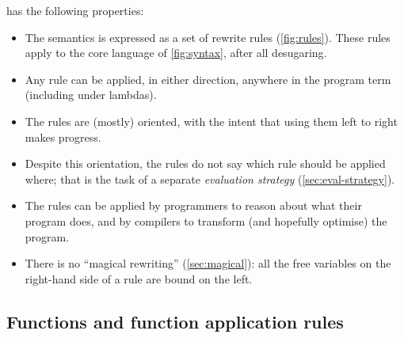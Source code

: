 \documentclass[acmsmall]{acmart}
\newcommand{\ie}{\emph{i.e.}\xspace}	%
\newcommand{\Eg}{\emph{E.g.}\xspace}
\begin{document}
has the following properties:
\begin{itemize}
\item The semantics is expressed as a set of rewrite rules (\cref{fig:rules}). These rules apply to the core language of \cref{fig:syntax}, after
  all desugaring.
\item Any rule can be applied, in either direction,
  anywhere in the program term (including under lambdas).
\item The rules are (mostly) oriented, with the intent that using them left to right makes progress.
\item Despite this orientation, the rules do not say which rule should be
  applied where; that is the task of a separate \emph{evaluation strategy} (\cref{sec:eval-strategy}).
\item The rules can be applied by programmers to reason about what their program does,
  and by compilers to transform (and hopefully optimise) the program.
\item There is no ``magical rewriting'' (\cref{sec:magical}):
  all the free variables on the
  right-hand side of a rule are bound on the left.
\end{itemize}

\figureRewriteRules
\figureContexts

%


\subsection{Functions and function application rules} \label{sec:beta}
\end{document}
